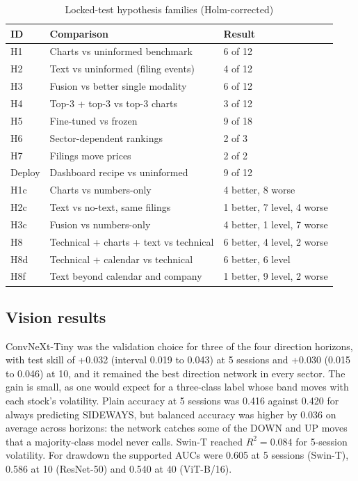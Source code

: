 \documentclass[conference]{IEEEtran}
\begin{document}
\begin{table}[t]
\caption{Locked-test hypothesis families (Holm-corrected)}
\label{tab:hyp}
\centering
\begin{tabular}{lll}
\toprule
ID & Comparison & Result \\
\midrule
H1 & Charts vs uninformed benchmark & 6 of 12 \\
H2 & Text vs uninformed (filing events) & 4 of 12 \\
H3 & Fusion vs better single modality & 6 of 12 \\
H4 & Top-3 + top-3 vs top-3 charts & 3 of 12 \\
H5 & Fine-tuned vs frozen & 9 of 18 \\
H6 & Sector-dependent rankings & 2 of 3 \\
H7 & Filings move prices & 2 of 2 \\
Deploy & Dashboard recipe vs uninformed & 9 of 12 \\
H1c & Charts vs numbers-only & 4 better, 8 worse \\
H2c & Text vs no-text, same filings & 1 better, 7 level, 4 worse \\
H3c & Fusion vs numbers-only & 4 better, 1 level, 7 worse \\
H8 & Technical + charts + text vs technical & 6 better, 4 level, 2 worse \\
H8d & Technical + calendar vs technical & 6 better, 6 level \\
H8f & Text beyond calendar and company & 1 better, 9 level, 2 worse \\
\bottomrule
\end{tabular}
\end{table}

\subsection{Vision results}

ConvNeXt-Tiny was the validation choice for three of the four direction horizons, with test skill of +0.032 (interval 0.019 to 0.043) at 5 sessions and +0.030 (0.015 to 0.046) at 10, and it remained the best direction network in every sector. The gain is small, as one would expect for a three-class label whose band moves with each stock's volatility. Plain accuracy at 5 sessions was 0.416 against 0.420 for always predicting SIDEWAYS, but balanced accuracy was higher by 0.036 on average across horizons: the network catches some of the DOWN and UP moves that a majority-class model never calls. Swin-T reached $R^2 = 0.084$ for 5-session volatility. For drawdown the supported AUCs were 0.605 at 5 sessions (Swin-T), 0.586 at 10 (ResNet-50) and 0.540 at 40 (ViT-B/16).
\end{document}
